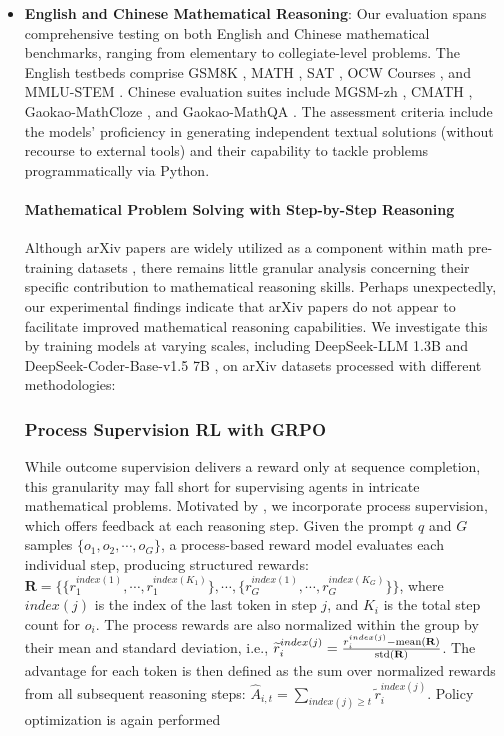 \begin{itemize}[topsep=0pt]
    \item \textbf{English and Chinese Mathematical Reasoning}: Our evaluation spans comprehensive testing on both English and Chinese mathematical benchmarks, ranging from elementary to collegiate-level problems. The English testbeds comprise GSM8K \citep{gsm8k}, MATH \citep{MATH}, SAT \citep{llemma}, OCW Courses \citep{minerva}, and MMLU-STEM \citep{mmlu}. Chinese evaluation suites include MGSM-zh \citep{mgsm}, CMATH \citep{wei2023cmath}, Gaokao-MathCloze \citep{agieval}, and Gaokao-MathQA \citep{agieval}. The assessment criteria include the models’ proficiency in generating independent textual solutions (without recourse to external tools) and their capability to tackle problems programmatically via Python.

\paragraph{Mathematical Problem Solving with Step-by-Step Reasoning}

Although arXiv papers are widely utilized as a component within math pre-training datasets \citep{minerva,gpt-f,llemma,mathpile}, there remains little granular analysis concerning their specific contribution to mathematical reasoning skills. Perhaps unexpectedly, our experimental findings indicate that arXiv papers do not appear to facilitate improved mathematical reasoning capabilities. We investigate this by training models at varying scales, including DeepSeek-LLM 1.3B and DeepSeek-Coder-Base-v1.5 7B \citep{deepseek-coder}, on arXiv datasets processed with different methodologies:

\subsubsection{Process Supervision RL with GRPO} 
While outcome supervision delivers a reward only at sequence completion, this granularity may fall short for supervising agents in intricate mathematical problems. Motivated by \cite{wang2023math}, we incorporate process supervision, which offers feedback at each reasoning step. Given the prompt $q$ and $G$ samples $\{o_1, o_2, \cdots, o_G\}$, a process-based reward model evaluates each individual step, producing structured rewards: $\mathbf{R} = \{ \{r_1^{index(1)},\cdots,r_1^{index(K_1)}\}, \cdots,  \{r_G^{index(1)},\cdots,r_G^{index(K_G)}\} \}$, where $index(j)$ is the index of the last token in step $j$, and $K_i$ is the total step count for $o_i$. The process rewards are also normalized within the group by their mean and standard deviation, i.e., $\widetilde{r}_i^{index(j)} = \frac{r_i^{index(j)} - {\rm mean(\mathbf{R})}}{{\rm std(\mathbf{R})}}$.
The advantage for each token is then defined as the sum over normalized rewards from all subsequent reasoning steps: $\hat{A}_{i, t} = \sum_{index(j) \ge t} \widetilde{r}_i^{index(j)}$. Policy optimization is again performed


\end{itemize}
